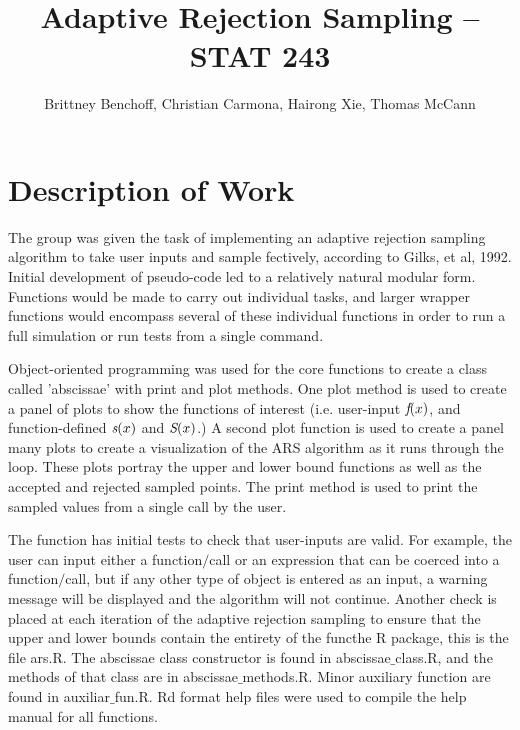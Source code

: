 \documentclass{article}\usepackage[]{graphicx}\usepackage[]{color}
\begin{document}
\pagestyle{fancy}



\title{Adaptive Rejection Sampling -- STAT 243}
\author{Brittney Benchoff, Christian Carmona, Hairong Xie, Thomas McCann}
\maketitle


\section{Description of Work}


The group was given the task of implementing an adaptive rejection sampling algorithm to take user inputs and sample fectively, according to Gilks, et al, 1992.  Initial development of pseudo-code led to a relatively natural modular form.  Functions would be made to carry out individual tasks, and larger wrapper functions would encompass several of these individual functions in order to run a full simulation or run tests from a single command. 

Object-oriented programming was used for the core functions to create a class called 'abscissae' with print and plot methods.  One plot method is used to create a panel of plots to show the functions of interest (i.e. user-input $\emph{f}(x)$, and function-defined $\emph{s}(x)$ and $\emph{S}(x)$.)  A second plot function is used to create a panel many plots to create a visualization of the ARS algorithm as it runs through the loop.  These plots portray the upper and lower bound functions as well as the accepted and rejected sampled points.  The print method is used to print the sampled values from a single call by the user.

The function has initial tests to check that user-inputs are valid.  For example, the user can input either a function$/$call or an expression that can be coerced into a function$/$call, but if any other type of object is entered as an input, a warning message will be displayed and the algorithm will not continue.  Another check is placed at each iteration of the adaptive rejection sampling to ensure that the upper and lower bounds contain the entirety of the functhe R package, this is the file ars.R.  The abscissae class constructor is found in abscissae$\_$class.R, and the methods of that class are in abscissae$\_$methods.R.  Minor auxiliary function are found in auxiliar$\_$fun.R.  Rd format help files were used to compile the help manual for all functions.
\end{document}
